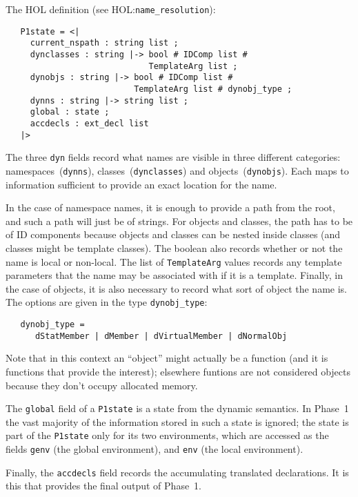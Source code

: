 \documentclass[11pt]{article}
\newcommand{\HOLfile}[1]{HOL:\texttt{#1}}
\begin{document}
The HOL definition (see \HOLfile{name_resolution}):
\begin{verbatim}
   P1state = <|
     current_nspath : string list ;
     dynclasses : string |-> bool # IDComp list #
                             TemplateArg list ;
     dynobjs : string |-> bool # IDComp list #
                          TemplateArg list # dynobj_type ;
     dynns : string |-> string list ;
     global : state ;
     accdecls : ext_decl list
   |>
\end{verbatim}
The three \texttt{dyn} fields record what names are visible in three
different categories: namespaces~(\texttt{dynns}),
classes~(\texttt{dynclasses}) and objects~(\texttt{dynobjs}).  Each
maps to information sufficient to provide an exact location for the
name.

In the case of namespace names, it is enough to provide a path from
the root, and such a path will just be of strings.  For objects and
classes, the path has to be of ID components because objects and
classes can be nested inside classes (and classes might be template
classes).  The boolean also records whether or not the name is local
or non-local.  The list of \texttt{TemplateArg} values records any
template parameters that the name may be associated with if it is a
template.  Finally, in the case of objects, it is also necessary to
record what sort of object the name is.  The options are given in the
type \texttt{dynobj_type}:
\begin{verbatim}
   dynobj_type =
      dStatMember | dMember | dVirtualMember | dNormalObj
\end{verbatim}
Note that in this context an ``object'' might actually be a function
(and it is functions that provide the interest); elsewhere funtions
are not considered objects because they don't occupy allocated
memory.

The \texttt{global} field of a \texttt{P1state} is a state from the
dynamic semantics.  In Phase~1 the vast majority of the information
stored in such a state is ignored; the state is part of the
\texttt{P1state} only for its two environments, which are accessed as
the fields \texttt{genv} (the global environment), and \texttt{env}
(the local environment).
%
%

Finally, the \texttt{accdecls} field records the accumulating
translated declarations.  It is this that provides the final output of
Phase~1.
\end{document}
